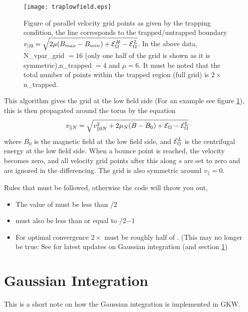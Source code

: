 \begin{figure}[h!]
\begin{center}
\texttt{[image: traplowfield.eps]}
\caption{Figure of parallel velocity grid points as given by the trapping condition, the line corresponds to the trapped/untrapped boundary $v_{||0} = \sqrt{2\mu(B_{max}-B_{min})+\mathcal{E}_\Omega^{H}-\mathcal{E}_\Omega^{L}}$.  In the above data, N_vpar_grid $= 16$ (only one half of the grid is shown as it is symmetric),n_trapped $= 4$ and $\mu = 6$. It must be noted that the total number of points within the trapped region (full grid) is $2\times$n_trapped.}
\label{lowfieldsidetrap}
\end{center}
\end{figure}

This algorithm gives the grid at the low field side (For an example see figure \ref{lowfieldsidetrap}), this is then propagated around the torus by the equation
\begin{equation}
v_{\parallel N} = \sqrt{v_{\parallel 0 N}^{2} + 2\mu_{N}(B - B_{0}) + \mathcal{E}_\Omega- \mathcal{E}_\Omega^{\rm L}}
\end{equation}
\noindent
where $B_{0}$ is the magnetic field at the low field side, and $\mathcal{E}_\Omega^L$ is the centrifugal energy at the low field side.  When a bounce point is reached, the velocity becomes zero, and all velocity grid points after this along $s$ are set to zero and are ignored in the differencing.  The grid is also symmetric around $v_{\parallel}=0$.


Rules that must be followed, otherwise the code will throw you out,
\begin{itemize}
\item The value of  must be less than /2
\item {} must also be less than or equal to /2$-1$
\item For optimal convergence $2\times$ must be roughly half of . (This may no longer be true: See  for latest updates on Gaussian integration (and section \ref{sec:gaussian-integration})
\end{itemize}

\section{Gaussian Integration}
\label{sec:gaussian-integration}

This is a short note on how the Gaussian integration is implemented in GKW. 

